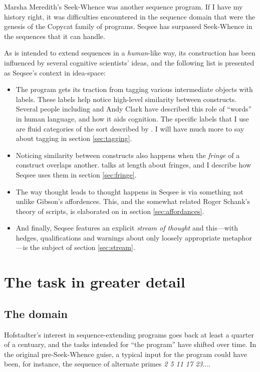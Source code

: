 \documentclass[letterpaper]{article}
\begin{document}
Marsha Meredith's Seek-Whence \cite{Meredith} was another sequence program. If I have my history right, it was difficulties encountered in the sequence domain that were the genesis of the Copycat family of programs. Seqsee has surpassed Seek-Whence in the sequences that it can handle.

As \seq is intended to extend sequences in a \emph{human}-like way, its construction has been influenced by several cognitive scientists' ideas, and the following list is presented as Seqsee's context in idea-space:

\begin{itemize}
\item The program gets its traction from tagging various intermediate objects with labels. These labels help \seq notice high-level similarity between constructs. Several people including  and Andy Clark \cite{Clark:MindWare,Clark:MagicWords} have described this role of ``words'' in human language, and how it aids cognition. The specific labels that I use are fluid categories of the sort described by \hof.
I will have much more to say about tagging in section \ref{sec:tagging}.

\item Noticing similarity between constructs also happens when the \emph{fringe} of a construct overlaps another.  talks at length about fringes, and I describe how Seqsee uses them in section \ref{sec:fringe}. 

\item The way thought leads to thought happens in Seqsee is via something not unlike Gibson's affordences.  This, and the somewhat related Roger Schank's theory of scripts, is elaborated on in section \ref{sec:affordances}.

\item And finally, Seqsee features an explicit \emph{stream of thought} \cite{James} and this---with hedges, qualifications and warnings about only loosely appropriate metaphor---is the subject of section \ref{sec:stream}.
\end{itemize}

\section{The task in greater detail}
\label{sec:task}


\subsection{The domain}
\label{sec:domain}
Hofstadter's interest in sequence-extending programs goes back at least a quarter of a centuary, and the tasks intended for ``the program'' have shifted over time. In the original pre-Seek-Whence guise, a typical input for the program could have been, for instance, the sequence of alternate primes \emph{2 5 11 17 23$\ldots$}.
\end{document}
